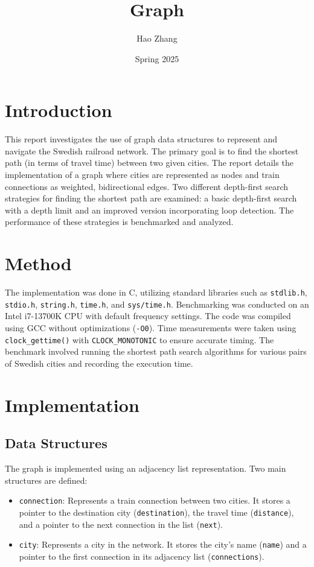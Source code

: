 \documentclass[a4paper,11pt]{article}
\begin{document}
\title{
    \textbf{Graph}
}
\author{Hao Zhang}
\date{Spring 2025}

\maketitle

\section*{Introduction}
This report investigates the use of graph data structures to represent and navigate the Swedish railroad network. The primary goal is to find the shortest path (in terms of travel time) between two given cities. The report details the implementation of a graph where cities are represented as nodes and train connections as weighted, bidirectional edges. Two different depth-first search strategies for finding the shortest path are examined: a basic depth-first search with a depth limit and an improved version incorporating loop detection. The performance of these strategies is benchmarked and analyzed.

\section*{Method}
The implementation was done in C, utilizing standard libraries such as \texttt{stdlib.h}, \texttt{stdio.h}, \texttt{string.h}, \texttt{time.h}, and \texttt{sys/time.h}. Benchmarking was conducted on an Intel i7-13700K CPU with default frequency settings. The code was compiled using GCC without optimizations (\texttt{-O0}). Time measurements were taken using \texttt{clock\_gettime()} with \texttt{CLOCK\_MONOTONIC} to ensure accurate timing. The benchmark involved running the shortest path search algorithms for various pairs of Swedish cities and recording the execution time.

\section*{Implementation}

\subsection*{Data Structures}
The graph is implemented using an adjacency list representation. Two main structures are defined:

\begin{itemize}
    \item \texttt{connection}: Represents a train connection between two cities. It stores a pointer to the destination city (\texttt{destination}), the travel time (\texttt{distance}), and a pointer to the next connection in the list (\texttt{next}).
    \item \texttt{city}: Represents a city in the network. It stores the city's name (\texttt{name}) and a pointer to the first connection in its adjacency list (\texttt{connections}).
\end{itemize}
\end{document}

